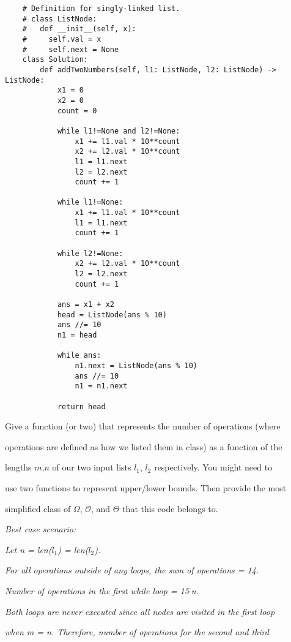 \documentclass{article}
\begin{document}
\begin{verbatim}
	# Definition for singly-linked list.
	# class ListNode:
	#   def __init__(self, x):
	#     self.val = x
	#     self.next = None
	class Solution:
		def addTwoNumbers(self, l1: ListNode, l2: ListNode) -> ListNode:
			x1 = 0
			x2 = 0
			count = 0

			while l1!=None and l2!=None:
				x1 += l1.val * 10**count
				x2 += l2.val * 10**count
				l1 = l1.next
				l2 = l2.next
				count += 1

			while l1!=None:
				x1 += l1.val * 10**count
				l1 = l1.next
				count += 1

			while l2!=None:
				x2 += l2.val * 10**count
				l2 = l2.next
				count += 1

			ans = x1 + x2
			head = ListNode(ans % 10)
			ans //= 10
			n1 = head
			
			while ans:
				n1.next = ListNode(ans % 10)
				ans //= 10
				n1 = n1.next

			return head
\end{verbatim}

Give a function (or two) that represents the number of operations (where 

operations are defined as how we listed them in class) as a function of the 

lengths $m$,$n$ of our two input lists $l_1$, $l_2$ respectively. You might need to 

use two functions to represent upper/lower bounds. Then provide the most 

simplified class of $\Omega$, $\mathcal{O}$, and $\Theta$ that this code belongs to.

\vspace{0.5cm} 
\textit{Best case scenario:}

\textit{Let n = len($l_1$) = len($l_2$).}

\vspace{0.25cm} 

\textit{For all operations outside of any loops, the sum of operations = 14.}

\vspace{0.25cm} 

\textit{Number of operations in the first while loop = 15$\cdot$n.}

\vspace{0.25cm} 

\textit{Both loops are never executed since all nodes are visited in the first loop}

\textit{when m = n. Therefore, number of operations for the second and third }
\end{document}
